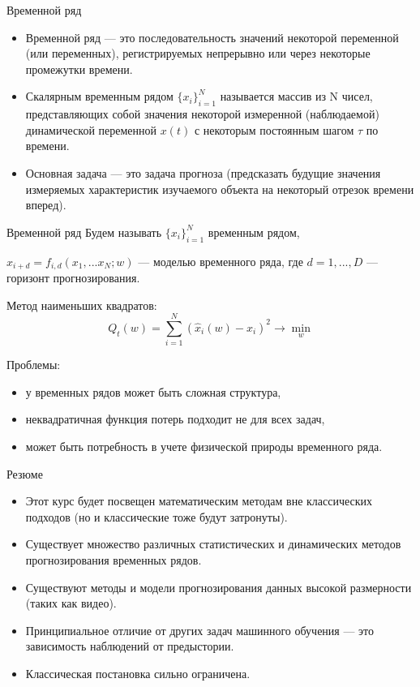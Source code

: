 \begin{frame}{Временной ряд}
\begin{itemize}
    \item Временной ряд --- это последовательность значений некоторой переменной (или переменных), регистрируемых непрерывно или через некоторые промежутки времени.
    
    \item Скалярным временным рядом $\{x_i\}_{i=1}^{N}$ называется массив из N чисел, представляющих собой значения некоторой измеренной (наблюдаемой) динамической переменной $x(t)$ с некоторым постоянным шагом $\tau$ по времени.

    \item Основная задача --- это задача прогноза (предсказать будущие значения измеряемых характеристик изучаемого объекта на некоторый отрезок времени вперед).
\end{itemize}
\end{frame}
\begin{frame}{Временной ряд}
Будем называть $\{x_i\}_{i=1}^{N}$ временным рядом,

$\hat{x}_{i+d} = f_{i,d}(x_1,...x_N;w)$ --- моделью временного ряда, где $d =1,...,D$ --- горизонт прогнозирования.

Метод наименьших квадратов:
    \begin{equation*}
        Q_t(w) = \sum_{i = 1}^{N}(\hat{x}_{i}(w) - x_i)^2 \rightarrow \min_w
    \end{equation*}

Проблемы:
\begin{itemize}
    \item у временных рядов может быть сложная структура,
    \item неквадратичная функция потерь подходит не для всех задач,
    \item может быть потребность в учете физической природы временного ряда.
\end{itemize}
\end{frame}
\begin{frame}{Резюме}
    \begin{itemize}
        \item Этот курс будет посвещен математическим методам вне классических подходов (но и классические тоже будут затронуты).
    	\item Существует множество различных статистических и динамических методов прогнозирования временных рядов.
        \item Существуют методы и модели прогнозирования данных высокой размерности (таких как видео).
        \item Принципиальное отличие от других задач машинного обучения --- это зависимость наблюдений от предыстории.
        \item Классическая постановка сильно ограничена.
    \end{itemize}
\end{frame}

 